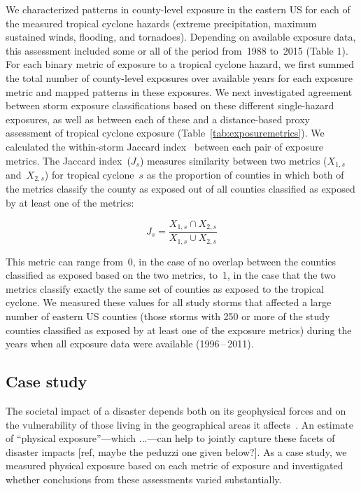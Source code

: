 We characterized patterns in county-level exposure in the eastern \ac{US} for
each of the measured tropical cyclone hazards (extreme precipitation, maximum
sustained winds, flooding, and tornadoes).  Depending on available exposure
data, this assessment included some or all of the period from~1988 to~2015
(Table 1). For each binary metric of exposure to a tropical cyclone hazard, we
first summed the total number of county-level exposures over available years
for each exposure metric and mapped patterns in these exposures. We next
investigated agreement between storm exposure classifications based on these
different single-hazard exposures, as well as between each of these and a
distance-based proxy assessment of tropical cyclone exposure
(Table~\ref{tab:exposuremetrics}). We calculated the within-storm Jaccard
index~\parencite{jaccard1901distribution, jaccard1908nouvelles} between each
pair of exposure metrics. The Jaccard index~($J_s$) measures similarity between
two metrics ($X_{1,s}$ and~$X_{2,s}$) for tropical cyclone~$s$ as the
proportion of counties in which both of the metrics classify the county as
exposed out of all counties classified as exposed by at least one of the
metrics:

\begin{equation} 
J_s = \frac{X_{1,s} \cap X_{2,s}}{X_{1,s} \cup X_{2,s}}
\end{equation}

\noindent This metric can range from~0, in the case of no overlap between the
counties classified as exposed based on the two metrics, to~1, in the case that
the two metrics classify exactly the same set of counties as exposed to the
tropical cyclone. We measured these values for all study storms that affected a
large number of eastern \ac{US} counties (those storms with 250 or more of the
study counties classified as exposed by at least one of the exposure metrics)
during the years when all exposure data were available (1996\,--\,2011).

\subsection*{Case study}

The societal impact of a disaster depends both on its geophysical forces and on
the vulnerability of those living in the geographical areas it
affects~\parencite{chakraborty2005population, anderson2003community,
cutter1996vulnerability}. An estimate of ``physical exposure''---which
...---can help to jointly capture these facets of disaster impacts [ref, maybe
the peduzzi one given below?]. As a case study, we measured physical exposure
based on each metric of exposure and investigated whether conclusions from
these assessments varied substantially.

